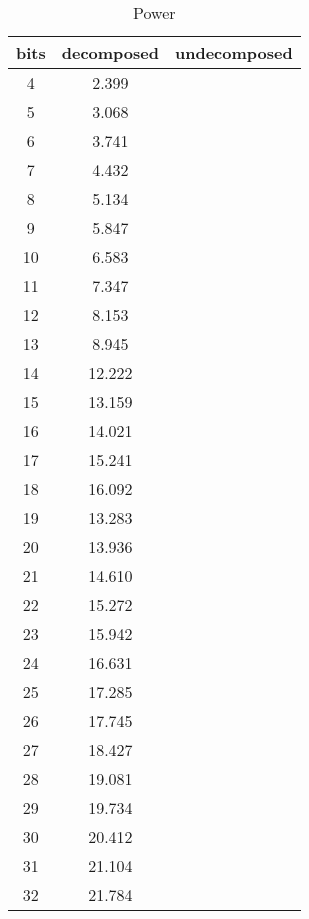 \documentclass{article}
\begin{document}
\begin{table}[h]
\centering
\begin{tabular}{c | c | c }
bits	 & decomposed	 & undecomposed \\ 
\hline4	 & 2.399	 &  \\ 
5	 & 3.068	 &  \\ 
6	 & 3.741	 &  \\ 
7	 & 4.432	 &  \\ 
8	 & 5.134	 &  \\ 
9	 & 5.847	 &  \\ 
10	 & 6.583	 &  \\ 
11	 & 7.347	 &  \\ 
12	 & 8.153	 &  \\ 
13	 & 8.945	 &  \\ 
14	 & 12.222	 &  \\ 
15	 & 13.159	 &  \\ 
16	 & 14.021	 &  \\ 
17	 & 15.241	 &  \\ 
18	 & 16.092	 &  \\ 
19	 & 13.283	 &  \\ 
20	 & 13.936	 &  \\ 
21	 & 14.610	 &  \\ 
22	 & 15.272	 &  \\ 
23	 & 15.942	 &  \\ 
24	 & 16.631	 &  \\ 
25	 & 17.285	 &  \\ 
26	 & 17.745	 &  \\ 
27	 & 18.427	 &  \\ 
28	 & 19.081	 &  \\ 
29	 & 19.734	 &  \\ 
30	 & 20.412	 &  \\ 
31	 & 21.104	 &  \\ 
32	 & 21.784	 &  \\ 
\end{tabular}
\caption{Power}
\end{table}
\end{document}
